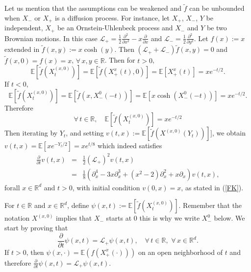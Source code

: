 \documentclass[a4paper, 11pt]{article}
\newcommand{\R}{\mathbb{R}}
\newcommand{\E}{\mathbb{E}}
\newcommand{\1}{\mathbf{1}}
\begin{document}
\noindent Let us mention that the assumptions can be weakened and $\tilde{f}$ can be unbounded when $X_-$ or $X_+$ is a diffusion process. For instance, let $X_+$, $X_-$, $Y$ be independent, $X_+$ be an Ornstein-Uhlenbeck process and $X_-$ and $Y$ be two Brownian motions. In this case $\mathcal{L}_+=\frac{1}{2}\frac{\partial^2}{\partial x^2}-x\frac{\partial}{\partial x}$ and $\mathcal{L}_-=\frac{1}{2}\frac{\partial^2}{\partial y^2}$. Let $f(x):=x$ extended in $\tilde{f}(x,y):=x\cosh(y)$. Then $(\mathcal{L}_++\mathcal{L}_-)\tilde f(x,y)=0$ and $\tilde{f}(x,0)=f(x)=x$, $\forall \, x,y\in \R$. Then for $t>0$,
\begin{equation*}
\E\left[\tilde{f}(X_t^{(x,0)})\right]=\E\left[\tilde{f}(X_+^x(t),0)\right]=\E\left[X_+^x(t)\right]=xe^{-t/2}.
\end{equation*}
If $t<0$,
\begin{equation*}
\E\left[\tilde{f}(X_t^{(x,0)})\right]=\E\left[\tilde{f}(x,X_-^0(-t))\right]=\E\left[x\cosh(X_-^0(-t))\right]=xe^{-t/2}.
\end{equation*}
Therefore
\begin{equation*}
\forall\,  t\in \R, \quad \E\left[\tilde{f}(X^{(x,0)}_t)\right]=xe^{-t/2}
\end{equation*}
Then iterating by $Y_t$, and setting $v(t,x):=\E\left[\tilde{f}(X^{(x,0)}(Y_t))\right]]$, we obtain $v(t,x)=\E\left[xe^{-Y_t/2}\right]=xe^{t/8}$ which indeed satisfies 
\begin{eqnarray*}
 \frac{\partial}{\partial t}v(t,x)&=&\frac{1}{2}(\mathcal{L}_+)^2v(t,x)\\
&=&\frac{1}{8}(\partial_x^4-3x\partial_x^3+(x^2-2)\partial_x^2+x\partial_x)v(t,x),
\end{eqnarray*}
forall $x\in \R^d$ and $t>0$, with initial condition $v(0,x)=x$, as stated in (\ref{FK}).

\bigskip

 For $t\in\R$ and $x\in \R^d$, define $\psi(x,t):=\E\left[\tilde{f}(X^{(x,0)}_t)\right]$. Remember that the notation $X^{(x,0)}$ implies that $X_-$ starts at $0$ this is why we write $X_-^0$ below. We start by proving that 
\begin{equation}\label{FKpourX}
 \frac{\partial}{\partial t}\psi(x,t)=\mathcal{L}_+\psi(x,t),\quad \forall \, t\in \R, \, \, \forall \, x\in\R^d.
\end{equation}
If $t>0$, then $\psi(x,\cdot)=\E(f(X_+^x(\cdot)))$ on an open neighborhood of $t$ and therefore $\frac{\partial}{\partial t}\psi(x,t)=\mathcal{L}_+\psi(x,t).$
\end{document}
